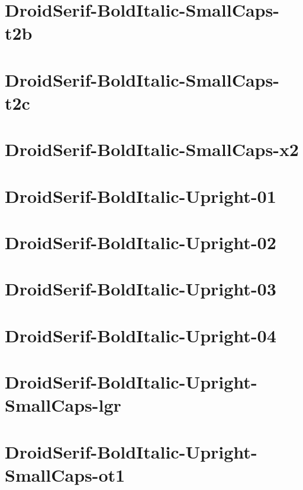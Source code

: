 \documentclass{article}
\begin{document}
\section{DroidSerif-BoldItalic-SmallCaps-t2b}

\section{DroidSerif-BoldItalic-SmallCaps-t2c}

\section{DroidSerif-BoldItalic-SmallCaps-x2}

\section{DroidSerif-BoldItalic-Upright-01}

\section{DroidSerif-BoldItalic-Upright-02}

\section{DroidSerif-BoldItalic-Upright-03}

\section{DroidSerif-BoldItalic-Upright-04}

\section{DroidSerif-BoldItalic-Upright-SmallCaps-lgr}

\section{DroidSerif-BoldItalic-Upright-SmallCaps-ot1}
\end{document}
